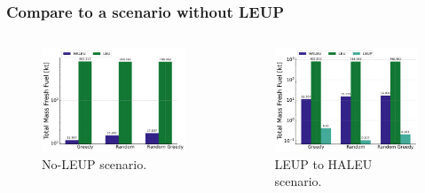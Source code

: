 \documentclass[9pt]{beamer}
\begin{document}
  \begin{frame}
    \frametitle{Compare to a scenario without LEUP}
    \begin{columns}
      \begin{column}{0.5\textwidth}
        \begin{figure}
          \centering
          \includegraphics[width=\textwidth]{../images/final_cumulative_fuel_of.pdf}
          \caption{No-LEUP scenario.}
        \end{figure}
      \end{column}
      \begin{column}{0.5\textwidth}
        \begin{figure}
          \centering
          \includegraphics[width=\textwidth]{../images/final_cumulative_fuel_mf.pdf}
          \caption{LEUP to HALEU scenario.}
        \end{figure}
      \end{column}
    \end{columns}
  \end{frame}
\end{document}
